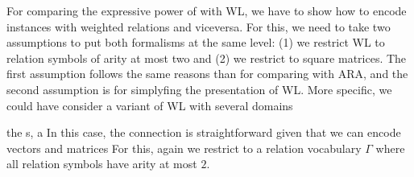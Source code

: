 For comparing the expressive power of \langprod with WL, we have to show how to encode \lang instances with weighted relations and viceversa. For this, we need to take two assumptions to put both formalisms at the same level: (1) we restrict WL to relation symbols of arity at most two and (2) we restrict \langprod to square matrices. The first assumption follows the same reasons than for comparing \langsum with ARA, and the second assumption is for simplyfing the presentation of WL. More specific, we could have consider a variant of WL with several domains

the s,  a In this case, the connection is straightforward given that we can encode vectors and matrices For this, again we restrict to a relation vocabulary $\Gamma$ where all relation symbols have arity at most $2$. 


